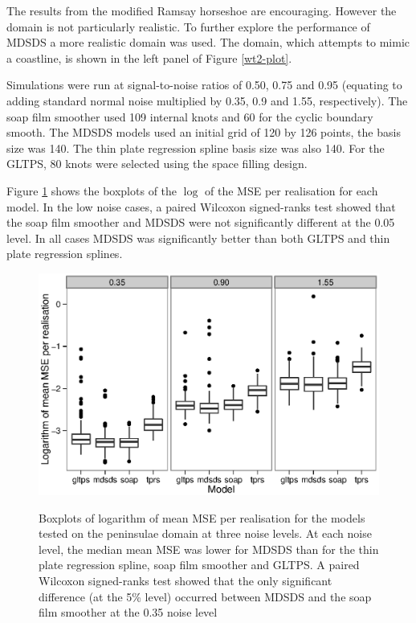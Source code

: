 \documentclass[smallextended]{svjour3}       %
\begin{document}
The results from the modified Ramsay horseshoe are encouraging. However the domain is not particularly realistic. To further explore the performance of MDSDS a more realistic domain was used. The domain, which attempts to mimic a coastline, is shown in the left panel of Figure \ref{wt2-plot}.

Simulations were run at signal-to-noise ratios of 0.50, 0.75 and 0.95 (equating to adding standard normal noise multiplied by 0.35, 0.9 and 1.55, respectively). The soap film smoother used 109 internal knots and 60 for the cyclic boundary smooth. The MDSDS models used an initial grid of 120 by 126 points, the basis size was 140. The thin plate regression spline basis size was also 140. For the GLTPS, 80 knots were selected using the space filling design.

Figure \ref{wt2-boxplots} shows the boxplots of the $\log$ of the MSE per realisation for each model. In the low noise cases, a paired Wilcoxon signed-ranks test showed that the soap film smoother and MDSDS were not significantly different at the 0.05 level. In all cases MDSDS was significantly better than both GLTPS and thin plate regression splines.


\begin{figure}
\centering
\includegraphics[width=\textwidth]{Fig5.eps} \\
\caption{Boxplots of logarithm of mean MSE per realisation for the models tested on the peninsulae domain at three noise levels. At each noise level, the median mean MSE was lower for MDSDS than for the thin plate regression spline, soap film smoother and GLTPS. A paired Wilcoxon signed-ranks test showed that the only significant difference (at the 5\% level) occurred between MDSDS and the soap film smoother at the 0.35 noise level}
\label{wt2-boxplots}
\end{figure}
\end{document}
